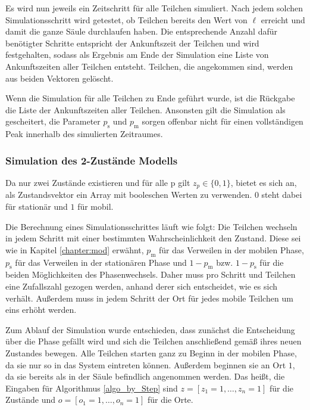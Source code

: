 Es wird nun jeweils ein Zeitschritt für alle Teilchen simuliert. Nach jedem solchen Simulationsschritt wird getestet, ob Teilchen bereits den Wert von $\ell$ erreicht und damit die ganze Säule durchlaufen haben. Die entsprechende Anzahl dafür benötigter Schritte entspricht der Ankunftszeit der Teilchen und wird festgehalten, sodass als Ergebnis am Ende der Simulation eine Liste von Ankunftszeiten aller Teilchen entsteht. Teilchen, die angekommen sind, werden aus beiden Vektoren gelöscht.

Wenn die Simulation für alle Teilchen zu Ende geführt wurde, ist die Rückgabe die Liste der Ankunftszeiten aller Teilchen. Ansonsten gilt die Simulation als gescheitert, die Parameter $p_{\text{s}}$ und $p_{\text{m}}$ sorgen offenbar nicht für einen vollständigen Peak innerhalb des simulierten Zeitraumes.

\subsubsection{Simulation des 2-Zustände Modells}

Da nur zwei Zustände existieren und für alle p gilt $z_p \in \{0,1\}$, bietet es sich an, als Zustandsvektor ein Array mit booleschen Werten zu verwenden. $0$ steht dabei für stationär und $1$ für mobil.

Die Berechnung eines Simulationsschrittes läuft wie folgt: Die Teilchen wechseln in jedem Schritt mit einer bestimmten Wahrscheinlichkeit den Zustand. Diese sei wie in Kapitel \ref{chapter:mod} erwähnt, $p_{\text{m}}$ für das Verweilen in der mobilen Phase, $p_{\text{s}}$ für das Verweilen in der stationären Phase und $1-p_{\text{m}}$ bzw. $1-p_{\text{s}}$ für die beiden Möglichkeiten des Phasenwechsels. Daher muss pro Schritt und Teilchen eine Zufallszahl gezogen werden, anhand derer sich entscheidet, wie es sich verhält. Außerdem muss in jedem Schritt der Ort für jedes mobile Teilchen um eins erhöht werden.

Zum Ablauf der Simulation wurde entschieden, dass zunächst die Entscheidung über die Phase gefällt wird und sich die Teilchen anschließend gemäß ihres neuen Zustandes bewegen. Alle Teilchen starten ganz zu Beginn in der mobilen Phase, da sie nur so in das System eintreten können. Außerdem beginnen sie an Ort $1$, da sie bereits als in der Säule befindlich angenommen werden. Das heißt, die Eingaben für Algorithmus \ref{algo_by_Step} sind $z= [z_1 = 1, \ldots, z_n=1]$ für die Zustände und $o= [o_1 = 1, \ldots, o_n=1]$ für die Orte.


